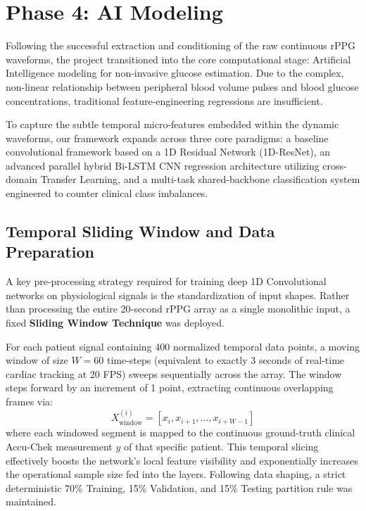 \clearpage
\section{Phase 4: AI Modeling}
\label{sec:phase4_modeling}
Following the successful extraction and conditioning of the raw continuous rPPG waveforms, the project transitioned into the core computational stage: Artificial Intelligence modeling for non-invasive glucose estimation. Due to the complex, non-linear relationship between peripheral blood volume pulses and blood glucose concentrations, traditional feature-engineering regressions are insufficient.

To capture the subtle temporal micro-features embedded within the dynamic waveforms, our framework expands across three core paradigms: a baseline convolutional framework based on a 1D Residual Network (1D-ResNet), an advanced parallel hybrid Bi-LSTM CNN regression architecture utilizing cross-domain Transfer Learning, and a multi-task shared-backbone classification system engineered to counter clinical class imbalances.

\subsection{Temporal Sliding Window and Data Preparation}
A key pre-processing strategy required for training deep 1D Convolutional networks on physiological signals is the standardization of input shapes. Rather than processing the entire 20-second rPPG array as a single monolithic input, a fixed \textbf{Sliding Window Technique} was deployed.

For each patient signal containing 400 normalized temporal data points, a moving window of size $W = 60$ time-steps (equivalent to exactly 3 seconds of real-time cardiac tracking at 20 FPS) sweeps sequentially across the array. The window steps forward by an increment of 1 point, extracting continuous overlapping frames via:
\begin{equation}
X_{\text{window}}^{(i)} = [x_i, x_{i+1}, \dots, x_{i+W-1}]
\end{equation}
where each windowed segment is mapped to the continuous ground-truth clinical Accu-Chek measurement $y$ of that specific patient. This temporal slicing effectively boosts the network's local feature visibility and exponentially increases the operational sample size fed into the layers. Following data shaping, a strict deterministic 70\% Training, 15\% Validation, and 15\% Testing partition rule was maintained.

